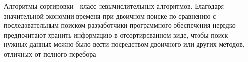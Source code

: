 Алгоритмы сортировки - класс невычислительных алгоритмов. Благодаря значительной экономии времени при двоичном поиске по сравнению с последовательным поиском разработчики программного обеспечения нередко предпочитают хранить информацию в отсортированном виде, чтобы поиск нужных данных можно было вести посредством двоичного или других методов, отличных от полного перебора \cite{McConnel}.